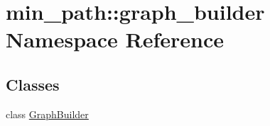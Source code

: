 \hypertarget{namespacemin__path_1_1graph__builder}{}\section{min\+\_\+path\+:\+:graph\+\_\+builder Namespace Reference}
\label{namespacemin__path_1_1graph__builder}
\subsection*{Classes}
\begin{DoxyCompactItemize}
\item 
class \hyperlink{classmin__path_1_1graph__builder_1_1_graph_builder}{Graph\+Builder}
\end{DoxyCompactItemize}
